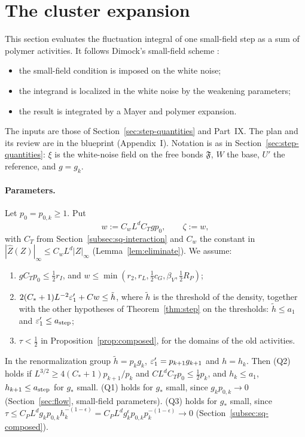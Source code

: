 \section{The cluster expansion}\label{sec:cluster}

This section evaluates the fluctuation integral of one small-field step as a sum of polymer activities. It follows Dimock's small-field scheme \cite[Sects.~4.3--4.6, App.~B]{DimockI}:
\begin{itemize}
\item the small-field condition is imposed on the white noise;
\item the integrand is localized in the white noise by the weakening parameters;
\item the result is integrated by a Mayer and polymer expansion.
\end{itemize}
The inputs are those of Section~\ref{sec:step-quantities} and Part~IX. The plan and its review are in the blueprint (Appendix~I). Notation is as in Section~\ref{sec:step-quantities}: $\xi$ is the white-noise field on the free bonds $\mathfrak F$, $W$ the base, $U'$ the reference, and $g=g_k$.

\paragraph{Parameters.} Let $p_0=p_{0,k}\ge1$. Put
\[
w:=C_wL^dC_Tgp_0,\qquad\zeta:=w,
\]
with $C_T$ from Section~\ref{subsec:sq-interaction} and $C_w$ the constant in $|\hat Z(Z)|_\infty\le C_wL^d|Z|_\infty$ (Lemma~\ref{lem:eliminate}). We assume:
\begin{enumerate}[label=(Q\arabic*)]
\item $gC_Tp_0\le\frac12r_I$, and $w\le\min(r_2,r_L,\frac12c_G,\beta_V,\frac12R_P)$;
\item $2(C_*+1)L^{-2}\varepsilon'_1+Cw\le\tilde h$, where $\tilde h$ is the threshold of the density, together with the other hypotheses of Theorem~\ref{thm:step} on the thresholds: $\tilde h\le a_1$ and $\varepsilon'_1\le a_{\rm step}$;
\item $\tau<\frac12$ in Proposition~\ref{prop:composed}, for the domains of the old activities.
\end{enumerate}
In the renormalization group $\tilde h=p_kg_k$, $\varepsilon'_1=p_{k+1}g_{k+1}$ and $h=h_k$. Then (Q2) holds if $L^{3/2}\ge4(C_*+1)p_{k+1}/p_k$ and $CL^dC_Tp_0\le\frac12p_k$, and $h_k\le a_1$, $h_{k+1}\le a_{\rm step}$ for $g_*$ small. (Q1) holds for $g_*$ small, since $g_kp_{0,k}\to0$ (Section~\ref{sec:flow}, small-field parameters). (Q3) holds for $g_*$ small, since $\tau\le C_PL^dg_kp_{0,k}h_k^{-(1-\epsilon)}=C_PL^dg_k^{\epsilon}p_{0,k}p_k^{-(1-\epsilon)}\to0$ (Section~\ref{subsec:sq-composed}).

